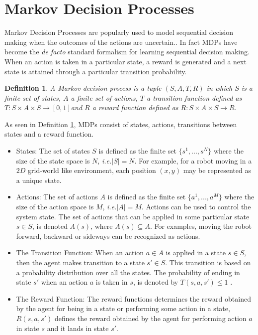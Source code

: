 \documentclass[12pt]{report}
\newtheorem{mydef}{Definition}
\newcommand{\ie}{\textit{i.e.}}
\begin{document}
\section{Markov Decision Processes}
\label{mdp}
Markov Decision Processes are popularly used to model sequential decision making when the outcomes of the actions are uncertain.\cite{puterman2014markov}. In fact MDPs have become the \textit{de facto} standard formalism for learning sequential decision making. When an action is taken in a particular state, a reward is generated and a next state is attained through a particular transition probability.

\begin{mydef}
\label{mdp_def}
A Markov decision process is a tuple $(S, A, T, R)$ in which $S$ is a finite set of states, $A$ a finite set of actions, $T$ a transition function defined as $T : S \times A \times S \rightarrow [0, 1] $and $R$ a reward function defined
as $R : S \times A \times S \rightarrow R$.
\end{mydef}

As seen in Definition \ref{mdp_def}, MDPs consist of states, actions, transitions between states and a reward function.
\begin{itemize}
\item States: The set of states $S$ is defined as the finite set $\{s^1,...,s^N\}$ where the size of the state space is $N$, \ie $|S| = N$. For example, for a robot moving in a $2D$ grid-world like environment, each position $(x,y)$ may be represented as a unique state.

\item Actions: The set of actions $A$ is defined as the finite set $\{a^1,...,a^M\}$ where the size of the action space is $M$, \ie $|A| = M$. Actions can be used to control the system state. The set of actions that can be applied in some particular state $s \in S$, is denoted $A(s)$,
where $A(s) \subseteq A$. For examples, moving the robot forward, backward or sideways can be recognized as actions.

\item The Transition Function: 
\label{transition_function}
When an action $a \in A$ is applied in a state $s \in S$, then the agent makes transition to a state $s' \in S$. This transition is based on a probability distribution over all the states. The probability of ending in state $s'$ when an action $a$ is taken in $s$, is denoted by $T(s,a,s') \leq 1$ .

 \item The Reward Function:
\label{reward_function}
The reward functions determines the reward obtained by the agent for being in a state or performing some action in a state, $R(s,a,s')$ defines the reward obtained by the agent for performing action $a$ in state $s$ and it lands in state $s'$.
\end{itemize}
\end{document}
